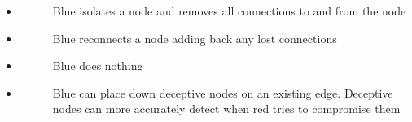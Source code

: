\documentclass[letterpaper,10pt,english]{sphinxmanual}
\begin{document}
\begin{itemize}
\begin{description}
\begin{itemize}
\begin{description}
\end{description}

\item {} \begin{description}
\item[{}] \leavevmode
\sphinxAtStartPar
Blue isolates a node and removes all connections to and from the node

\end{description}

\item {} \begin{description}
\item[{}] \leavevmode
\sphinxAtStartPar
Blue reconnects a node adding back any lost connections

\end{description}

\item {} \begin{description}
\item[{}] \leavevmode
\sphinxAtStartPar
Blue does nothing

\end{description}

\item {} \begin{description}
\item[{}] \leavevmode
\sphinxAtStartPar
Blue can place down deceptive nodes on an existing edge. Deceptive nodes can more accurately detect when red tries to compromise them

\end{description}

\end{itemize}

\end{description}

\end{itemize}
\end{document}
